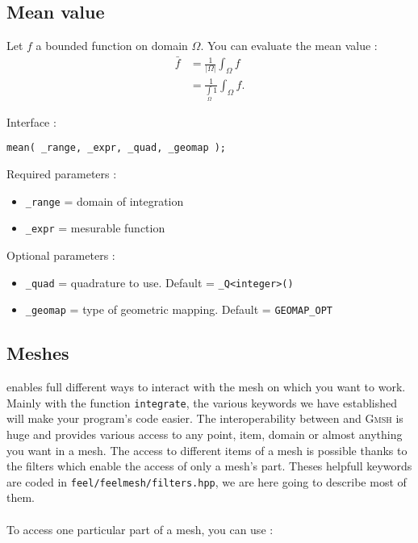 \subsection{Mean value}
Let $f$ a bounded function on domain $\Omega$. You can evaluate the mean value :
\begin{align*}
 \bar{f}&=\frac{1}{|\Omega|}\int_\Omega f\\
&=\frac{1}{\int\limits_\Omega 1}\int_\Omega f.
\end{align*}

\label{keywords:mean}
\noindent Interface :
\begin{lstlisting}
mean( _range, _expr, _quad, _geomap );
\end{lstlisting}

\noindent Required parameters :
\begin{itemize}
 \item \lstinline!_range! = domain of integration
 \item \lstinline!_expr! = mesurable function
\end{itemize}

\noindent Optional parameters :
\begin{itemize}
 \item \lstinline!_quad! = quadrature to use. Default = \lstinline!_Q<integer>()!
 \item \lstinline!_geomap! = type of geometric mapping. Default = \lstinline!GEOMAP_OPT!
\end{itemize}

\subsection{Meshes}
\label{keywords:meshes}

\feel enables full different ways to interact with the mesh on which you want to work. Mainly with the function \lstinline!integrate!, the various keywords we have established will make your program's code easier. The interoperability between \feel and \textsc{Gmsh} is huge and provides various access to any point, item, domain or almost anything you want in a mesh.
The access to different items of a mesh is possible thanks to the filters which enable the access of only a mesh's part. Theses helpfull keywords are coded in \lstinline!feel/feelmesh/filters.hpp!, we are here going to describe most of them. \\ \\ To access one particular part of a mesh, you can use :

